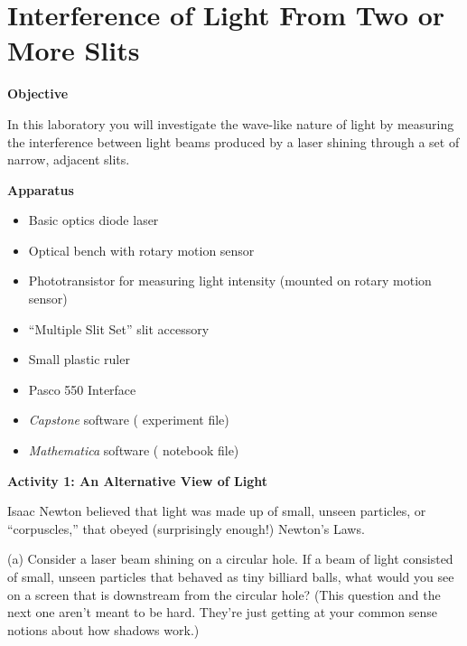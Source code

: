 
\section{Interference of Light From Two or More Slits}
\label{interference_lab}
\makelabheader %

\medskip
\textbf{Objective}

In this laboratory you will investigate the wave-like nature of light by measuring the interference 
between light beams produced by a laser shining through a set of narrow, adjacent
slits. 

\medskip
\textbf{Apparatus}

\begin{itemize}[nosep]
\item Basic optics diode laser
\item Optical bench with rotary motion sensor
\item Phototransistor for measuring light intensity (mounted on rotary motion sensor)
\item ``Multiple Slit Set'' slit accessory
\item Small plastic ruler
\item Pasco 550 Interface 
\item \textit{Capstone} software ( experiment file)
\item \textit{Mathematica} software ( notebook file)
\end{itemize}


\medskip
\textbf{Activity 1: An Alternative View of Light}

Isaac Newton believed that light was made up of small, unseen particles, or ``corpuscles,''
that obeyed (surprisingly enough!) Newton's Laws. 


(a) Consider a laser beam shining on a circular hole. If a beam of
light consisted of small, unseen particles that behaved as tiny billiard
balls, what would you see on a screen that is downstream from the circular
hole?  (This question and the next one aren't meant to be hard.
They're just getting at your common sense notions about how shadows work.)

